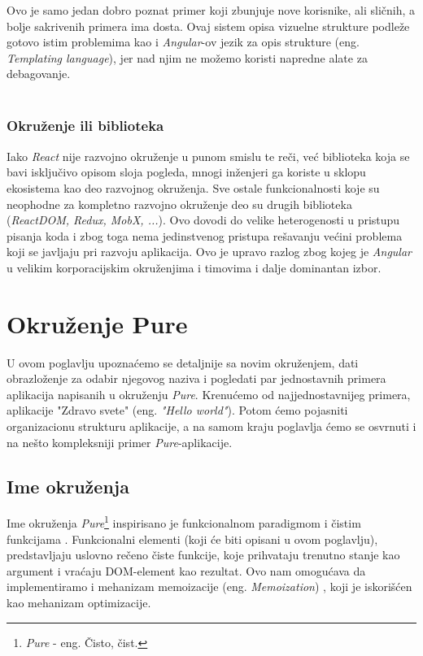 \documentclass[12pt,oneside]{memoir}
\begin{document}
Ovo je samo jedan dobro poznat primer koji zbunjuje nove korisnike, ali sličnih, a bolje sakrivenih primera ima dosta.
Ovaj sistem opisa vizuelne strukture podleže gotovo istim problemima kao i \emph{Angular}-ov jezik za opis strukture (eng. \emph{Templating language}),
jer nad njim ne možemo koristi napredne alate za debagovanje.
\\
\\

\subsection{Okruženje ili biblioteka}
Iako \emph{React} nije razvojno okruženje u punom smislu te reči, već biblioteka koja se bavi isključivo opisom sloja pogleda,
mnogi inženjeri ga koriste u sklopu ekosistema kao deo razvojnog okruženja.
Sve ostale funkcionalnosti koje su neophodne za kompletno razvojno okruženje deo su drugih biblioteka (\emph{ReactDOM, Redux, MobX, ...}).
Ovo dovodi do velike heterogenosti u pristupu pisanja koda i zbog toga nema jedinstvenog pristupa rešavanju većini problema
koji se javljaju pri razvoju aplikacija. Ovo je upravo razlog zbog kojeg je \emph{Angular} u velikim korporacijskim okruženjima i timovima
i dalje dominantan izbor.
\chapter{Okruženje Pure}\label{chap:pure-okruzenje}
U ovom poglavlju upoznaćemo se detaljnije sa novim okruženjem, dati obrazloženje
za odabir njegovog naziva i pogledati par jednostavnih primera aplikacija napisanih u okruženju \emph{Pure}.
Krenućemo od najjednostavnijeg
primera, aplikacije "Zdravo svete" (eng. \emph{"Hello world"}). Potom ćemo pojasniti organizacionu strukturu aplikacije, 
a na samom kraju poglavlja ćemo se osvrnuti i na nešto kompleksniji primer \emph{Pure}-aplikacije.
\section{Ime okruženja}

Ime okruženja \emph{Pure}\footnote{\emph{Pure} - eng. Čisto, čist.} inspirisano je 
funkcionalnom paradigmom i čistim funkcijama \cite{functionalProgramming}. Funkcionalni elementi (koji će biti opisani u ovom poglavlju),
predstavljaju uslovno rečeno čiste funkcije, koje prihvataju trenutno stanje kao argument i vraćaju
DOM-element kao rezultat. Ovo nam omogućava da implementiramo i mehanizam memoizacije (eng. \emph{Memoization}) \cite{functionalProgramming},
koji je iskorišćen kao mehanizam optimizacije.
\end{document}
